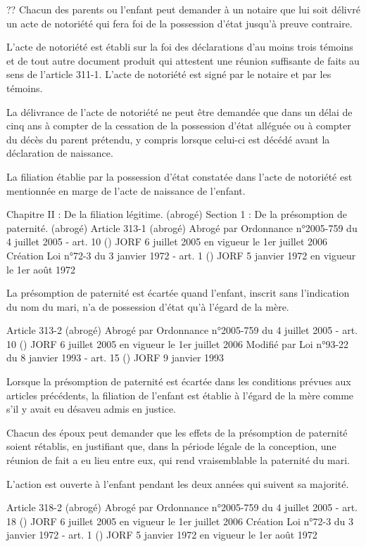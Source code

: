 \documentclass[
  12pt,
]{book}
\begin{document}
\begin{encadre}{??}
Chacun des parents ou l'enfant peut demander à un notaire que lui soit délivré un acte de notoriété qui fera foi de la possession d'état jusqu'à preuve contraire.

L'acte de notoriété est établi sur la foi des déclarations d'au moins trois témoins et de tout autre document produit qui attestent une réunion suffisante de faits au sens de l'article 311-1. L'acte de notoriété est signé par le notaire et par les témoins.

La délivrance de l'acte de notoriété ne peut être demandée que dans un délai de cinq ans à compter de la cessation de la possession d'état alléguée ou à compter du décès du parent prétendu, y compris lorsque celui-ci est décédé avant la déclaration de naissance.

La filiation établie par la possession d'état constatée dans l'acte de notoriété est mentionnée en marge de l'acte de naissance de l'enfant.

Chapitre II : De la filiation légitime. (abrogé)
Section 1 : De la présomption de paternité. (abrogé)
Article 313-1 (abrogé)
Abrogé par Ordonnance n°2005-759 du 4 juillet 2005 - art. 10 () JORF 6 juillet 2005 en vigueur le 1er juillet 2006
Création Loi n°72-3 du 3 janvier 1972 - art. 1 () JORF 5 janvier 1972 en vigueur le 1er août 1972

La présomption de paternité est écartée quand l'enfant, inscrit sans l'indication du nom du mari, n'a de possession d'état qu'à l'égard de la mère.

Article 313-2 (abrogé)
Abrogé par Ordonnance n°2005-759 du 4 juillet 2005 - art. 10 () JORF 6 juillet 2005 en vigueur le 1er juillet 2006
Modifié par Loi n°93-22 du 8 janvier 1993 - art. 15 () JORF 9 janvier 1993

Lorsque la présomption de paternité est écartée dans les conditions prévues aux articles précédents, la filiation de l'enfant est établie à l'égard de la mère comme s'il y avait eu désaveu admis en justice.

Chacun des époux peut demander que les effets de la présomption de paternité soient rétablis, en justifiant que, dans la période légale de la conception, une réunion de fait a eu lieu entre eux, qui rend vraisemblable la paternité du mari.

L'action est ouverte à l'enfant pendant les deux années qui suivent sa majorité.

Article 318-2 (abrogé)
Abrogé par Ordonnance n°2005-759 du 4 juillet 2005 - art. 18 () JORF 6 juillet 2005 en vigueur le 1er juillet 2006
Création Loi n°72-3 du 3 janvier 1972 - art. 1 () JORF 5 janvier 1972 en vigueur le 1er août 1972


\end{encadre}
\end{document}
